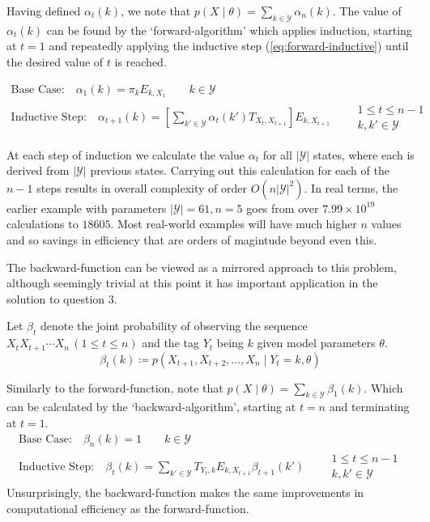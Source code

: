 \documentclass[../main.tex]{subfiles}
\begin{document}
Having defined $\alpha_t(k)$, we note that $p (X \mid \theta) = \sum_{k \in \mathcal{Y}} \alpha_n(k)$.
The value of $\alpha_t(k)$ can be found by the `forward-algorithm' which applies induction, starting at $t=1$ and repeatedly applying the inductive step (\ref{eq:forward-inductive}) until the desired value of $t$ is reached.

\begin{gather*}
    \text{Base Case:} \quad \alpha_1(k) = \pi_{k} E_{k,X_1} \qquad k \in \mathcal{Y} \\
    \text{Inductive Step:} \quad \alpha_{t+1}(k) = \left[ \sum_{k' \in \mathcal{Y}} \alpha_{t}(k')T_{X_t,X_{t+1}} \right] E_{k,X_{t+1}} \qquad
        \begin{array}{lr}
            1 \leq t \leq n-1\\
            k, k' \in \mathcal{Y}
        \end{array} \label{eq:forward-inductive}
\end{gather*}

At each step of induction we calculate the value $\alpha_t$ for all $|\mathcal{Y}|$ states, where each is derived from $|\mathcal{Y}|$ previous states.
Carrying out this calculation for each of the $n-1$ steps results in overall complexity of order $O(n|\mathcal{Y}|^2)$.
In real terms, the earlier example with parameters $|\mathcal{Y}|=61,n=5$ goes from over $7.99 \times 10^{19}$ calculations to $18605$. Most real-world examples will have much higher $n$ values and so savings in efficiency that are orders of magintude beyond even this.

The backward-function can be viewed as a mirrored approach to this problem, although seemingly trivial at this point it has important application in the solution to question 3.

\begin{definition} \label{def:backward-func}
    Let $\beta_t$ denote the joint probability of observing the sequence $X_t X_{t+1} \cdots X_n \, (1 \leq t \leq n)$ and the tag $Y_t$ being $k$ given model parameters $\theta$.
    \begin{equation*}
        \beta_t(k) \coloneqq p (X_{t+1},X_{t+2},\ldots,X_n \mid Y_t=k, \theta)
    \end{equation*}
\end{definition}

Similarly to the forward-function, note that $p (X \mid \theta) = \sum_{k \in \mathcal{Y}} \beta_1(k)$. Which can be calculated by the `backward-algorithm', starting at $t=n$ and terminating at $t=1$.
\begin{gather*}
    \text{Base Case:} \quad \beta_n(k) = 1 \qquad k \in \mathcal{Y} \\
    \text{Inductive Step:} \quad \beta_{t}(k) = \sum_{k' \in \mathcal{Y}} T_{Y_t,k} E_{k,X_{t+1}} \beta_{t+1}(k') \qquad
        \begin{array}{lr}
            1 \leq t \leq n-1\\
            k,k' \in \mathcal{Y}
        \end{array}
\end{gather*}
Unsurprisingly, the backward-function makes the same improvements in computational efficiency as the forward-function.
\end{document}
